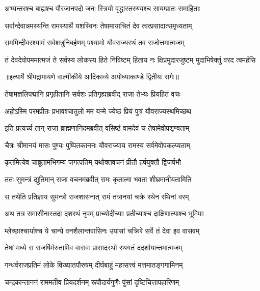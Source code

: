 \twolineshloka
{अभ्यन्तरश्च बाह्यश्च पौरजानपदो जनः}
{स्त्रियो वृद्धास्तरुण्यश्च सायम्प्रातः समाहिताः} %

\twolineshloka
{सर्वान्देवान्नमस्यन्ति रामस्यार्थे यशस्विनः}
{तेषामायाचितं देव त्वत्प्रसादात्समृध्यताम्} %

\twolineshloka
{राममिन्दीवरश्यामं सर्वशत्रुनिबर्हणम्}
{पश्यामो यौवराज्यस्थं तव राजोत्तमात्मजम्} %

\fourlineindentedshloka
{तं देवदेवोपममात्मजं ते}
{सर्वस्य लोकस्य हिते निविष्टम्}
{हिताय नः क्षिप्रमुदारजुष्टम्}
{मुदाभिषेक्तुं वरद त्वमर्हसि} %


{॥इत्यार्षे श्रीमद्रामायणे वाल्मीकीये आदिकाव्ये अयोध्याकाण्डे द्वितीयः सर्गः॥}


\twolineshloka
{तेषामज्ञलिपद्मानि प्रगृहीतानि सर्वशः}
{प्रतिगृह्याब्रवीद् राजा तेभ्यः प्रियहितं वचः} %

\twolineshloka
{अहोऽस्मि परमप्रीतः प्रभावश्चातुलो मम}
{यन्मे ज्येष्ठं प्रियं पुत्रं यौवराज्यस्थमिच्छथ} %

\twolineshloka
{इति प्रत्यर्च्य तान् राजा ब्राह्मणानिदमब्रवीत्}
{वसिष्ठं वामदेवं च तेषामेवोपशृण्वताम्} %

\twolineshloka
{चैत्रः श्रीमानयं मासः पुण्यः पुष्पितकाननः}
{यौवराज्याय रामस्य सर्वमेवोपकल्प्यताम्} %

\twolineshloka
{कृतमित्येव चाब्रूतामभिगम्य जगत्पतिम्}
{यथोक्तवचनं प्रीतौ हर्षयुक्तौ द्विजर्षभौ} %

\twolineshloka
{ततः सुमन्त्रं द्युतिमान् राजा वचनमब्रवीत्}
{रामः कृतात्मा भवता शीघ्रमानीयतामिति} %

\twolineshloka
{स तथेति प्रतिज्ञाय सुमन्त्रो राजशासनात्}
{रामं तत्रानयां चक्रे रथेन रथिनां वरम्} %

\twolineshloka
{अथ तत्र समासीनास्तदा दशरथं नृपम्}
{प्राच्योदीच्याः प्रतीच्याश्च दाक्षिणात्याश्च भूमिपाः} %

\twolineshloka
{म्लेच्छाश्चार्याश्च ये चान्ये वनशैलान्तवासिनः}
{उपासां चक्रिरे सर्वे तं देवा इव वासवम्} %

\twolineshloka
{तेषां मध्ये स राजर्षिर्मरुतामिव वासवः}
{प्रासादस्थो रथगतं ददर्शायान्तमात्मजम्} %

\twolineshloka
{गन्धर्वराजप्रतिमं लोके विख्यातपौरुषम्}
{दीर्घबाहुं महासत्त्वं मत्तमातङ्गगामिनम्} %

\twolineshloka
{चन्द्रकान्ताननं राममतीव प्रियदर्शनम्}
{रूपौदार्यगुणैः पुंसां दृष्टिचित्तापहारिणम्} %

